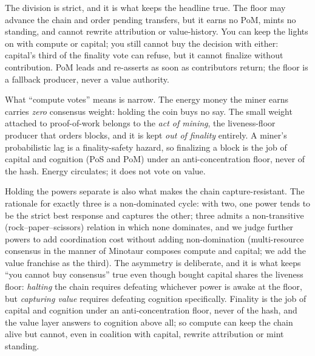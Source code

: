 \documentclass[10pt]{article}
\begin{document}
The division is strict, and it is what keeps the headline true. The floor may advance the chain and
order pending transfers, but it earns no PoM, mints no standing, and cannot rewrite attribution or
value-history. You can keep the lights on with compute or capital; you still cannot buy the decision
with either: capital's third of the finality vote can refuse, but it cannot finalize without
contribution. PoM leads and re-asserts as soon as contributors return; the floor is a fallback producer,
never a value authority.

What ``compute votes'' means is narrow. The energy money the miner earns carries \emph{zero} consensus
weight: holding the coin buys no say. The small weight attached to proof-of-work belongs to the \emph{act
of mining}, the liveness-floor producer that orders blocks, and it is kept \emph{out of finality}
entirely. A miner's probabilistic lag is a finality-safety hazard, so finalizing a block is the job of
capital and cognition (PoS and PoM) under an anti-concentration floor, never of the hash. Energy
circulates; it does not vote on value.

Holding the powers separate is also what makes the chain capture-resistant. The rationale for exactly
three is a non-dominated cycle: with two, one power tends to be the strict best response and captures the
other; three admits a non-transitive (rock--paper--scissors) relation in which none dominates, and we
judge further powers to add coordination cost without adding non-domination (multi-resource consensus in
the manner of Minotaur composes compute and capital; we add the value franchise as the third). The
asymmetry is deliberate, and it is what keeps ``you cannot buy consensus'' true even though bought capital
shares the liveness floor: \emph{halting} the chain requires defeating whichever power is awake at the
floor, but \emph{capturing value} requires defeating cognition specifically. Finality is the job of
capital and cognition under an anti-concentration floor, never of the hash, and the value layer answers to
cognition above all; so compute can keep the chain alive but cannot, even in coalition with capital,
rewrite attribution or mint standing.
\end{document}
